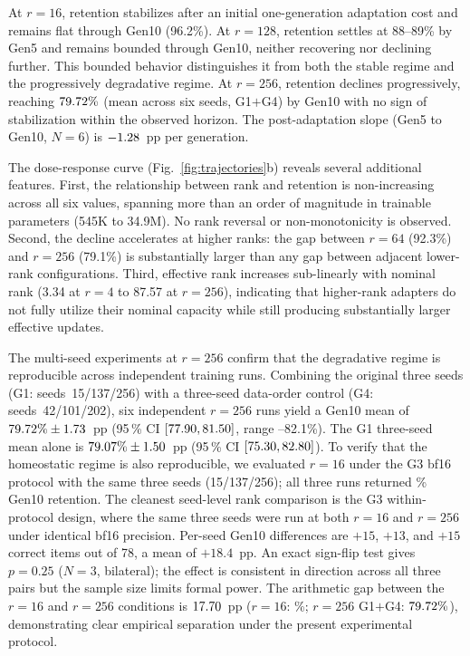 \documentclass[a4paper,fleqn]{cas-dc}
\newif\ifshowchanges
\newcommand{\rev}[1]{\ifshowchanges{\color{blue}#1}\else{#1}\fi}
\begin{document}
At $r=16$, retention stabilizes after
an initial one-generation adaptation cost and remains flat through Gen10
(96.2\%). At $r=128$, retention settles at
88--89\% by Gen5 and remains bounded through Gen10, neither
recovering nor declining further. This bounded behavior distinguishes it from
both the stable regime and the progressively degradative regime. At
$r=256$, retention declines progressively,
reaching \rev{$79.72\%$} (mean across \rev{six seeds, G1$+$G4}) by Gen10 with no sign of
stabilization within the observed horizon. The post-adaptation slope
\rev{(Gen5 to Gen10, $N=6$) is $-1.28$~pp per generation.}

The dose-response curve (Fig.~\ref{fig:trajectories}b) reveals several
additional features. First, the
relationship between rank and retention is non-increasing across all
six values, spanning more than an order of magnitude in trainable parameters
(545K to 34.9M). No rank reversal or non-monotonicity is observed. Second, the
decline accelerates at higher ranks: the gap between $r=64$ (92.3\%) and $r=256$
(79.1\%) is substantially larger than any gap between adjacent lower-rank
configurations. Third, effective rank increases sub-linearly with nominal rank
(3.34 at $r=4$ to 87.57 at $r=256$), indicating that higher-rank adapters do not
fully utilize their nominal capacity while still producing substantially larger
effective updates.

The multi-seed experiments at $r=256$ confirm that the degradative regime is
reproducible across independent training runs.
\rev{Combining the original three seeds (G1: seeds~15/137/256) with a three-seed
data-order control (G4: seeds~42/101/202), six independent $r=256$ runs
yield a Gen10 mean of $79.72\%\pm1.73$~pp
(95\,\% CI $[77.90, 81.50]$, range \GoneSeedFifteenTen--82.1\%).
The G1 three-seed mean alone is $79.07\%\pm1.50$~pp
(95\,\% CI $[75.30, 82.80]$).}
To verify that the homeostatic regime is also reproducible, we evaluated $r=16$
under the G3 bf16 protocol with the same three seeds (15/137/256); all three runs
returned \RsixteenMten\% Gen10 retention.
\rev{The cleanest seed-level rank comparison is the G3 within-protocol design,
where the same three seeds were run at both $r=16$ and $r=256$ under identical
bf16 precision. Per-seed Gen10 differences are $+15$, $+13$, and $+15$ correct
items out of 78, a mean of $+18.4$~pp. An exact sign-flip test gives $p=0.25$
($N=3$, bilateral); the effect is consistent in direction across all three pairs
but the sample size limits formal power.}
The arithmetic gap between the $r=16$ and $r=256$ conditions is
$17.70$~pp ($r=16$: \RsixteenMten\%; $r=256$ G1$+$G4: $79.72\%$),
demonstrating clear empirical separation under the present experimental protocol.
\end{document}
